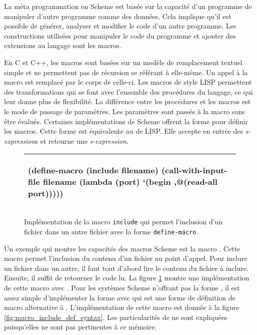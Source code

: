 La méta programmation en Scheme est basée sur la capacité d'un programme de
manipuler d'autre programme comme des données. Cela implique qu'il est possible
de générer, analyser et modifier le code d'un autre programme.  Les
constructions utilisées pour manipuler le code du programme et ajouter des
extensions au langage sont les macros.

En C et C++, les macros sont basées sur un modèle de remplacement textuel simple
et ne permettent pas de récursion se référant à elle-même.  Un appel à la macro
est remplacé par le corps de celle-ci. Les macros de style LISP permettent des
transformations qui se font avec
l'ensemble des procédures du langage, ce qui leur donne plus de flexibilité.  La
différence entre les procédures et les macros est le mode de passage de
paramètres.  Les paramètres sont passés à la macro sans être évalués.
Certaines implémentations de Scheme offrent la forme 
pour définir les macros.  Cette forme est équivalente au  de
LISP. Elle accepte en entrée des \textit{s-expression}s et retourne une
\textit{s-expression}.

\begin{figure}[htbp]
  \begin{tabular}{|l|}\hline
\begin{mplisting}{0.7}
(define-macro (include filename)
  (call-with-input-file
    filename
    (lambda (port)
      `(begin
        ,@(read-all port)))))
\end{mplisting}\\\hline
\end{tabular}

  \caption{Implémentation de la macro \texttt{include} qui permet l'inclusion
  d'un fichier dans un autre fichier avec la forme \texttt{define-macro}.}

  \label{fig:macro_include}
\end{figure}

Un exemple qui montre les capacités des macros Scheme est la macro
.  Cette macro permet l'inclusion du contenu d'un fichier au
point d'appel.  Pour inclure un fichier dans un autre, il faut tout d'abord
lire le contenu du fichier à inclure. Ensuite, il suffit de retourner le code
lu. La figure \ref{fig:macro_include} montre une implémentation de cette macro
avec .  Pour les systèmes Scheme n'offrant pas la forme
, il est assez simple d'implémenter la forme
 avec  qui est une forme de définition
de macro alternative à . L'implémentation de cette macro
est donnée à la figure \ref{fig:macro_include_def_syntax}. Les particularités
de  ne sont expliquées puisqu'elles ne sont pas
pertinentes à ce mémoire.

